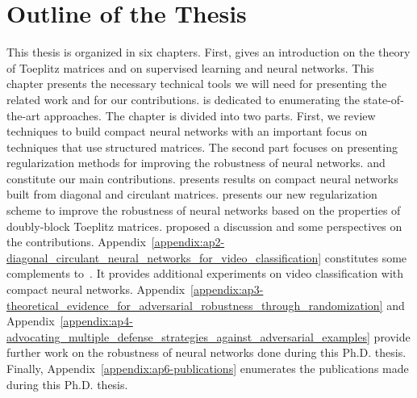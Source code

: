 \section*{Outline of the Thesis}
\label{section:ch1-outline_of_the_thesis}

This thesis is organized in six chapters.
First,  gives an introduction on the theory of Toeplitz matrices and on supervised learning and neural networks.
This chapter presents the necessary technical tools we will need for presenting the related work and for our contributions.
 is dedicated to enumerating the state-of-the-art approaches.
The chapter is divided into two parts.
First, we review techniques to build compact neural networks with an important focus on techniques that use structured matrices.
The second part focuses on presenting regularization methods for improving the robustness of neural networks.
 and  constitute our main contributions.
 presents results on compact neural networks built from diagonal and circulant matrices. 
 presents our new regularization scheme to improve the robustness of neural networks based on the properties of doubly-block Toeplitz matrices.
 proposed a discussion and some perspectives on the contributions.
Appendix~\ref{appendix:ap2-diagonal_circulant_neural_networks_for_video_classification} constitutes some complements to~.
It provides additional experiments on video classification with compact neural networks.
Appendix~\ref{appendix:ap3-theoretical_evidence_for_adversarial_robustness_through_randomization} and Appendix~\ref{appendix:ap4-advocating_multiple_defense_strategies_against_adversarial_examples} provide further work on the robustness of neural networks done during this Ph.D. thesis.
Finally, Appendix~\ref{appendix:ap6-publications} enumerates the publications made during this Ph.D. thesis.




